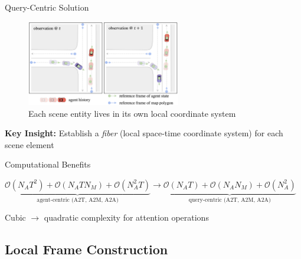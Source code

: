 \documentclass[10pt,aspectratio=169]{beamer}
\begin{document}
\begin{frame}{Query-Centric Solution}
\begin{figure}[ht]
\centering
\includegraphics[width=0.6\textwidth, height=0.4\textheight, keepaspectratio]{docs/latex/figures/qc_reference_frame.png}
\caption{Each scene entity lives in its own local coordinate system~\cite{qcnetZhou2023}}
\end{figure}

\textbf{Key Insight:} Establish a \emph{fiber} (local space-time coordinate system) for each scene element~\cite{qcnetZhou2023}

\begin{block}{Computational Benefits~\cite{qcnetZhou2023}}
\begin{center}
\footnotesize
$\underbrace{\mathcal{O}(N_{A}T^2)+\mathcal{O}(N_{A}TN_M)+\mathcal{O}(N_{A}^2T)}_{\text{agent-centric (A2T, A2M, A2A)}}
\longrightarrow
\underbrace{\mathcal{O}(N_{A}T)+\mathcal{O}(N_{A}N_M)+\mathcal{O}(N_{A}^2)}_{\text{query-centric (A2T, A2M, A2A)}}$
\end{center}
\end{block}
\begin{center}
Cubic \( \rightarrow \) quadratic complexity for attention operations
\end{center}
\end{frame}

\subsection{Local Frame Construction}
\end{document}
